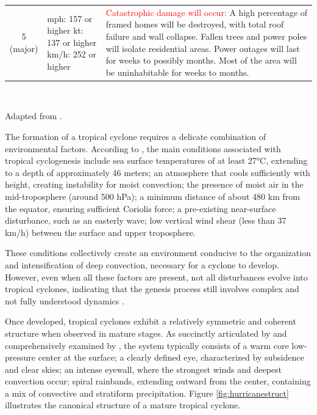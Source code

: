 \begin{table}[H]
{\begin{tabular}{c>{\centering\arraybackslash}p{4.5cm}>{\centering\arraybackslash}p{11cm}}
			5 (major) & 
			mph: 157 or higher \newline
			kt: 137 or higher \newline
			km/h: 252 or higher & 
			\textcolor{red}{Catastrophic damage will occur:} A high percentage of framed homes will be destroyed, with total roof failure and wall collapse. Fallen trees and power poles will isolate residential areas. Power outages will last for weeks to possibly months. Most of the area will be uninhabitable for weeks to months. \\
		\end{tabular}
	}
	\vspace{2mm}
	\label{tab:saffirsimpson}
	
	~%
	\begin{minipage}[t]{\dimexpr\textwidth - 1.8cm}
		\justifying Adapted from .
	\end{minipage}
\end{table}

The formation of a tropical cyclone requires a delicate combination of environmental factors. According to  , the main conditions associated with tropical cyclogenesis include sea surface temperatures of at least 27°C, extending to a depth of approximately 46 meters; an atmosphere that cools sufficiently with height, creating instability for moist convection; the presence of moist air in the mid-troposphere (around 500 hPa); a minimum distance of about 480 km from the equator, ensuring sufficient Coriolis force; a pre-existing near-surface disturbance, such as an easterly wave; low vertical wind shear (less than 37 km/h) between the surface and upper troposphere.

These conditions collectively create an environment conducive to the organization and intensification of deep convection, necessary for a cyclone to develop. However, even when all these factors are present, not all disturbances evolve into tropical cyclones, indicating that the genesis process still involves complex and not fully understood dynamics \cite{perez2021performance}.

Once developed, tropical cyclones exhibit a relatively symmetric and coherent structure when observed in mature stages. As succinctly articulated by  and comprehensively examined by , the system typically consists of a warm core low-pressure center at the surface; a clearly defined eye, characterized by subsidence and clear skies; an intense eyewall, where the strongest winds and deepest convection occur; spiral rainbands, extending outward from the center, containing a mix of convective and stratiform precipitation. Figure \ref{fig:hurricanestruct} illustrates the canonical structure of a mature tropical cyclone.

